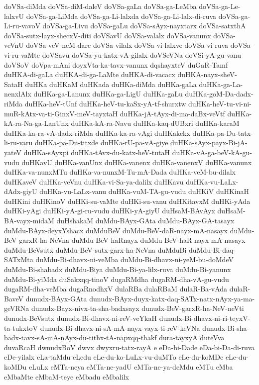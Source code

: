 {doVSa-diMda
doVSa-diM-daleV
doVSa-gaLa
doVSa-ga-LeMba
doVSa-ga-Le-lalxvU
doVSa-ga-LiMda
doVSa-ga-Li-lalxda
doVSa-ga-Li-lalx-di-ruva
doVSa-ga-Li-ru-vavoV
doVSa-ga-Livu
doVSa-gaLu
doVSa-sAyx-nayxtarx
doVSa-satxthA
doVSa-sutx-layx-shecxV-diti
doVSavU
doVSa-valalx
doVSa-vanunx
doVSa-veVnU
doVSa-veV-neM-dare
doVSa-vilalx
doVSa-vi-lalxve
doVSa-vi-ruva
doVSa-vi-ru-vaMte
doVSavu
doVSa-yu-katx-vA-gilalx
doVSeVNa
doVSi-yA-gu-vanu
doVSoV
doVpa-mAni
doyxVta-ka-tavx-vanunx
dqshayxteV
duGaR-Tamf
duHKA-di-gaLa
duHKA-di-ga-LaMte
duHKA-di-vacacx
duHKA-nayx-sheV-SataH
duHKa
duHKaM
duHKada
duHKa-diMda
duHKa-gaLa
duHKa-ga-La-nenxlAlx
duHKa-ga-Lanunx
duHKa-ga-LigU
duHKa-gaLu
duHKa-goM-Da-dadx-riMda
duHKa-heV-tUnf
duHKa-heV-tu-kaSx-yA-tf-shurxtw
duHKa-heV-tu-vi-ni-muR-kAtx-va-ti-GinxV-meV-tayxtaH
duHKa-jA-tAyx-di-ma-daBx-veVtf
duHKa-kA-ra-Na-ga-LanUnx
duHKa-kA-ra-Navu
duHKa-kaq-dUBxri
duHKa-karaM
duHKa-ka-ra-vA-dadx-riMda
duHKa-ka-ra-vAgi
duHKakekx
duHKa-pa-Du-tatx-li-ru-varu
duHKa-pa-Du-titxde
duHKa-rU-pa-vA-giye
duHKa-sAyx-payx-Bi-jA-yateV
duHKa-sAyxpi
duHKa-tAvx-du-katx-heV-tutaH
duHKa-vA-ga-beV-kA-gu-vudu
duHKavU
duHKa-vanUnx
duHKa-vanenx
duHKa-vanenxV
duHKa-vanunx
duHKa-va-nunxMTu
duHKa-va-nunxM-Tu-mA-Dada
duHKa-veM-bu-dilalx
duHKaveV
duHKa-veVnu
duHKa-vi-Sa-ya-dalilx
duHKavu
duHKa-vu-LaLx-dAdx-giyU
duHKa-vu-LaLx-vanu
duHKa-vuM-TA-gu-vudu
duHKiV
duHKinaH
duHKini
duHKinoV
duHKi-su-vaMte
duHKi-su-vanu
duHKitavxM
duHKi-yAda
duHKi-yAgi
duHKi-yA-gi-ru-vudu
duHKi-yA-giyU
duHsaM-BAvAyx
duHsaM-BA-vayx-midaM
duHshakaM
duMdu-BAyx-GAta
duMdu-BAyx-GA-tasayx
duMdu-BAyx-deyxYshacx
duMduBeV
duMdu-BeV-daR-nayx-mA-nasayx
duMdu-BeV-garxR-ha-NeVna
duMdu-BeV-haRnayx
duMdu-BeV-haR-nayx-mA-nasayx
duMdu-BeVsutx
duMdu-BeV-sutx-garx-ha-NeVna
duMduBi
duMdu-Bi-daq-SATxMta
duMdu-Bi-dhavx-ni-veMba
duMdu-Bi-dhavx-ni-yeM-bu-doMdeV
duMdu-Bi-shabadx
duMdu-Biya
duMdu-Bi-ya-lilx-ruva
duMdu-Bi-yanunx
duMdu-Bi-yiMda
duSakxqq-tinoV
dugaRMdha
dugaRM-dha-vA-gu-vudu
dugaRM-dha-veMba
dugaRnodhxV
dulaRBa
dulaRBaM
dulaR-Ba-vAda
dulaR-BaveV
dunudx-BAyx-GAta
dunudx-BAyx-duyx-katx-daq-SATx-natx-nAyx-ya-ma-geVRNa
dunudx-Bayx-nivx-ta-sha-badxsayx
dunudx-BeV-garxR-ha-NeV-neVti
dunudx-BeVsutx
dunudx-Bi-dhavx-ni-reV-veYkaH
dunudx-Bi-dhavx-ni-ri-teyxV-ta-tukxtoV
dunudx-Bi-dhavx-ni-sA-mA-nayx-vayx-ti-reV-keVNa
dunudx-Bi-sha-badx-tavx-sA-mA-nAyx-du-tithx-tA-napxqq-thakf
dura-tayxyA
duteVva
duvaRcaH
dwnudxBoV
dwvx
dwyxru-tatx-rayA
e
eDa-bi-Dade
eDa-bi-Da-di-ruva
eDe-yilalx
eLa-taMdu
eLedu
eLe-du-ko-LuLx-vu-duMTo
eLe-du-koMDe
eLe-du-koMDu
eLuLx
eMTa-neya
eMTa-ne-yadU
eMTa-ne-ya-deMdu
eMTu
eMba
eMbaMte
eMbaM-teye
eMbadu
eMbalilx
}

